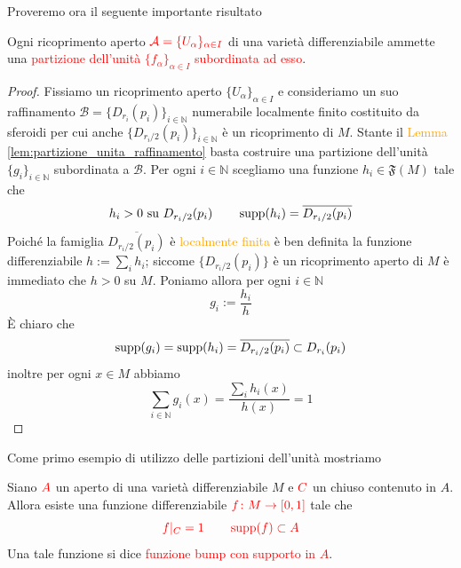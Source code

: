         Proveremo ora il seguente importante risultato

        \begin{teorema}
        \label{th:esistenza_partizioni_unita}
        \mbox{}

        Ogni ricoprimento aperto $\textcolor{red}{\mathcal{A} = \{U_\alpha\}_{\alpha \in I}}$ di una varietà differenziabile ammette una \textcolor{red}{partizione dell'unità $\{f_\alpha\}_{\alpha \in I}$ subordinata ad esso}.
        \end{teorema}

        \begin{proof}
        Fissiamo un ricoprimento aperto $\{U_\alpha\}_{\alpha \in I}$ e consideriamo un suo raffinamento $\mathcal{B} = \{D_{r_i}(p_i)\}_{i \in \mathbb{N}}$ numerabile localmente finito costituito da sferoidi per cui anche $\{D_{r_i/2}(p_i)\}_{i \in \mathbb{N}}$ è un ricoprimento di $M$. Stante il \textcolor{orange}{Lemma \ref{lem:partizione_unita_raffinamento}} basta costruire una partizione dell'unità $\{g_i\}_{i \in \mathbb{N}}$ subordinata a $\mathcal{B}$. Per ogni $i \in \mathbb{N}$ scegliamo una funzione $h_i \in \mathfrak{F}(M)$ tale che
        \[
        h_i > 0 \text{ su } D_{r_i/2}(p_i) \qquad \operatorname{supp}(h_i) = \overline{D_{r_i/2}(p_i)}
        \]
        Poiché la famiglia $\overline{D_{r_i/2}(p_i)}$ è \textcolor{orange}{localmente finita} è ben definita la funzione differenziabile $h := \sum_i h_i$; siccome $\{D_{r_i/2}(p_i)\}$ è un ricoprimento aperto di $M$ è immediato che $h > 0$ su $M$. Poniamo allora per ogni $i \in \mathbb{N}$
        \[
        g_i := \frac{h_i}{h}
        \]
        È chiaro che
        \[
        \operatorname{supp}(g_i) = \operatorname{supp}(h_i) = \overline{D_{r_i/2}(p_i)} \subset D_{r_i}(p_i)
        \]
        inoltre per ogni $x \in M$ abbiamo
        \[
        \sum_{i \in \mathbb{N}} g_i(x) = \frac{\sum_i h_i(x)}{h(x)} = 1
        \]
        \end{proof}

        Come primo esempio di utilizzo delle partizioni dell'unità mostriamo

        \begin{corollario}
        \label{cor:esistenza_funzioni_bump}
        \mbox{}

        Siano $\textcolor{red}{A}$ un aperto di una varietà differenziabile $M$ e $\textcolor{red}{C}$ un chiuso contenuto in $A$. Allora esiste una funzione differenziabile $\textcolor{red}{f \colon M \to [0, 1]}$ tale che
        \[
        \textcolor{red}{f|_C = 1 \qquad \operatorname{supp}(f) \subset A}
        \]
        Una tale funzione si dice \textcolor{red}{funzione bump con supporto in $A$}.
        \end{corollario}

